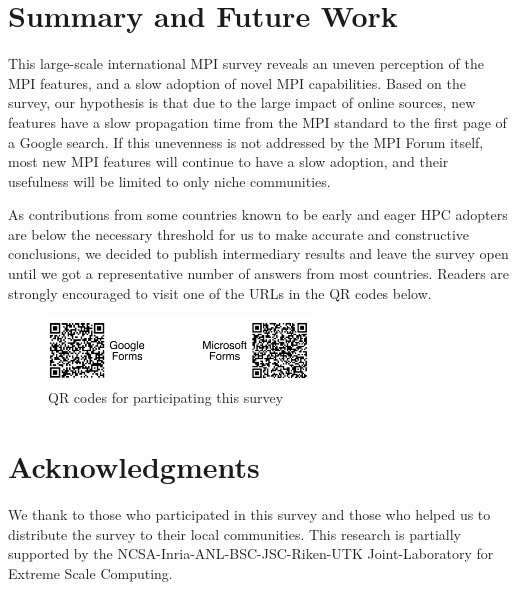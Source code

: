 \documentclass[sigconf,nonacm]{acmart}
\begin{document}
\section{Summary and Future Work}

This large-scale international MPI survey reveals an uneven perception of the
MPI features, and a slow adoption of novel MPI capabilities.
%
Based on the survey, our hypothesis is that due to the large impact of online
sources, new features have a slow propagation time from the MPI standard to
the first page of a Google search. If this unevenness is not addressed by the MPI
Forum itself, most new MPI features will continue to have a slow adoption, and
their usefulness will be limited to only niche communities.

As contributions from some countries known to be early and eager HPC adopters
are below the necessary threshold for us to make accurate and constructive
conclusions, we decided to publish intermediary results and leave the
survey open until we got a representative number of answers from most countries.
%
Readers are strongly encouraged to visit one of the URLs in the QR codes below.

\begin{figure}[htb]
\begin{center}
\includegraphics[width=7cm]{figs/QR-codes.pdf}
\vspace{-3mm}
\caption{QR codes for participating this survey}
\label{fig:qrcodes}
\end{center}
\vspace{-5mm}
\end{figure}

\section*{Acknowledgments}
{\small
We thank to those who participated in this survey and those who
helped us to distribute the survey to their local communities.
This research is partially supported by the
NCSA-Inria-ANL-BSC-JSC-Riken-UTK Joint-Laboratory for Extreme Scale
Computing\cite{JLESC}.
}


\end{document}
